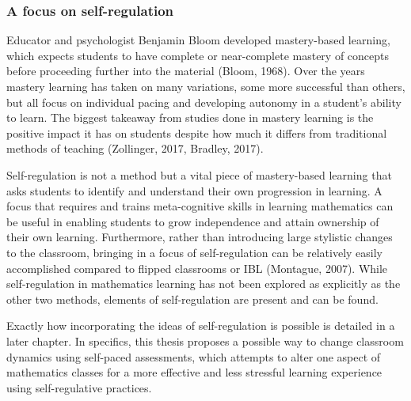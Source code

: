 \subsubsection{A focus on self-regulation}
Educator and psychologist Benjamin Bloom developed mastery-based learning, which expects students to have complete or near-complete mastery of concepts before proceeding further into the material (Bloom, 1968). Over the years mastery learning has taken on many variations, some more successful than others, but all focus on individual pacing and developing autonomy in a student's ability to learn. The biggest takeaway from studies done in mastery learning is the positive impact it has on students despite how much it differs from traditional methods of teaching (Zollinger, 2017, Bradley, 2017).

Self-regulation is not a method but a vital piece of mastery-based learning that asks students to identify and understand their own progression in learning. A focus that requires and trains meta-cognitive skills in learning mathematics can be useful in enabling students to grow independence and attain ownership of their own learning. Furthermore, rather than introducing large stylistic changes to the classroom, bringing in a focus of self-regulation can be relatively easily accomplished compared to flipped classrooms or IBL (Montague, 2007). While self-regulation in mathematics learning has not been explored as explicitly as the other two methods, elements of self-regulation are present and can be found.

Exactly how incorporating the ideas of self-regulation is possible is detailed  in a later chapter. In specifics, this thesis proposes a possible way to change classroom dynamics using self-paced assessments, which attempts to alter one aspect of mathematics classes for a more effective and less stressful learning experience using self-regulative practices.

